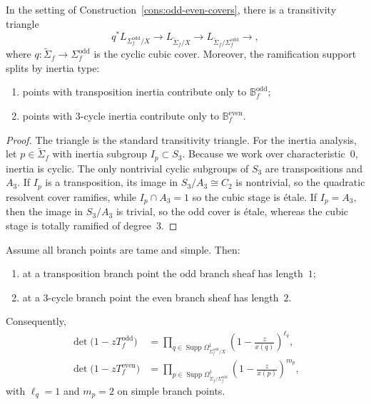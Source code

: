 \begin{theorem}
\label{thm:odd-even-branch-splitting}
In the setting of Construction~\ref{cons:odd-even-covers}, there is a
transitivity triangle
\[
q^*L_{\Sigma^{\mathrm{odd}}_f/X}
\longrightarrow
L_{\widetilde\Sigma_f/X}
\longrightarrow
L_{\widetilde\Sigma_f/\Sigma^{\mathrm{odd}}_f}
\longrightarrow,
\]
where $q\colon\widetilde\Sigma_f\to\Sigma^{\mathrm{odd}}_f$ is the cyclic cubic
cover.  Moreover, the ramification support splits by inertia type:
\begin{enumerate}[label=\textup{(\roman*)}]
\item points with transposition inertia contribute only to
$\mathbb B^{\mathrm{odd}}_f$;
\item points with $3$-cycle inertia contribute only to
$\mathbb B^{\mathrm{even}}_f$.
\end{enumerate}
\end{theorem}

\begin{proof}
The triangle is the standard transitivity triangle.  For the inertia analysis,
let $p\in\widetilde\Sigma_f$ with inertia subgroup $I_p\subset S_3$.  Because we
work over characteristic~$0$, inertia is cyclic.  The only nontrivial cyclic
subgroups of $S_3$ are transpositions and $A_3$.  If $I_p$ is a transposition,
its image in $S_3/A_3\cong C_2$ is nontrivial, so the quadratic resolvent cover
ramifies, while $I_p\cap A_3=1$ so the cubic stage is étale.  If
$I_p=A_3$, then the image in $S_3/A_3$ is trivial, so the odd cover is étale,
whereas the cubic stage is totally ramified of degree~$3$.
\end{proof}

\begin{corollary}
\label{cor:odd-even-local-lengths}
Assume all branch points are tame and simple.  Then:
\begin{enumerate}[label=\textup{(\roman*)}]
\item at a transposition branch point the odd branch sheaf has length~$1$;
\item at a $3$-cycle branch point the even branch sheaf has length~$2$.
\end{enumerate}
Consequently,
\begin{align*}
\det\bigl(1-zT_f^{\mathrm{odd}}\bigr)
&=
\prod_{q\in \operatorname{Supp}\Omega^1_{\Sigma^{\mathrm{odd}}_f/X}}
\left(1-\frac{z}{x(q)}\right)^{\ell_q},\\
\det\bigl(1-zT_f^{\mathrm{even}}\bigr)
&=
\prod_{p\in \operatorname{Supp}\Omega^1_{\widetilde\Sigma_f/\Sigma^{\mathrm{odd}}_f}}
\left(1-\frac{z}{x(p)}\right)^{m_p},
\end{align*}
with $\ell_q=1$ and $m_p=2$ on simple branch points.
\end{corollary}

